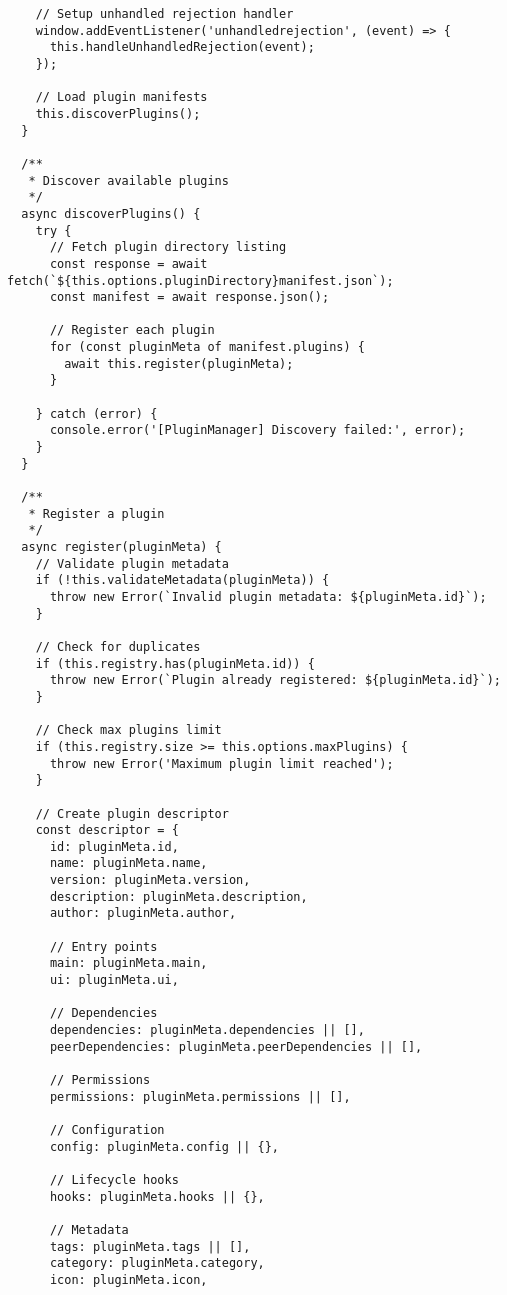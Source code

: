 \documentclass[11pt]{article}
\begin{document}
\begin{verbatim}
    // Setup unhandled rejection handler
    window.addEventListener('unhandledrejection', (event) => {
      this.handleUnhandledRejection(event);
    });
    
    // Load plugin manifests
    this.discoverPlugins();
  }
  
  /**
   * Discover available plugins
   */
  async discoverPlugins() {
    try {
      // Fetch plugin directory listing
      const response = await fetch(`${this.options.pluginDirectory}manifest.json`);
      const manifest = await response.json();
      
      // Register each plugin
      for (const pluginMeta of manifest.plugins) {
        await this.register(pluginMeta);
      }
      
    } catch (error) {
      console.error('[PluginManager] Discovery failed:', error);
    }
  }
  
  /**
   * Register a plugin
   */
  async register(pluginMeta) {
    // Validate plugin metadata
    if (!this.validateMetadata(pluginMeta)) {
      throw new Error(`Invalid plugin metadata: ${pluginMeta.id}`);
    }
    
    // Check for duplicates
    if (this.registry.has(pluginMeta.id)) {
      throw new Error(`Plugin already registered: ${pluginMeta.id}`);
    }
    
    // Check max plugins limit
    if (this.registry.size >= this.options.maxPlugins) {
      throw new Error('Maximum plugin limit reached');
    }
    
    // Create plugin descriptor
    const descriptor = {
      id: pluginMeta.id,
      name: pluginMeta.name,
      version: pluginMeta.version,
      description: pluginMeta.description,
      author: pluginMeta.author,
      
      // Entry points
      main: pluginMeta.main,
      ui: pluginMeta.ui,
      
      // Dependencies
      dependencies: pluginMeta.dependencies || [],
      peerDependencies: pluginMeta.peerDependencies || [],
      
      // Permissions
      permissions: pluginMeta.permissions || [],
      
      // Configuration
      config: pluginMeta.config || {},
      
      // Lifecycle hooks
      hooks: pluginMeta.hooks || {},
      
      // Metadata
      tags: pluginMeta.tags || [],
      category: pluginMeta.category,
      icon: pluginMeta.icon,
      

\end{verbatim}
\end{document}
